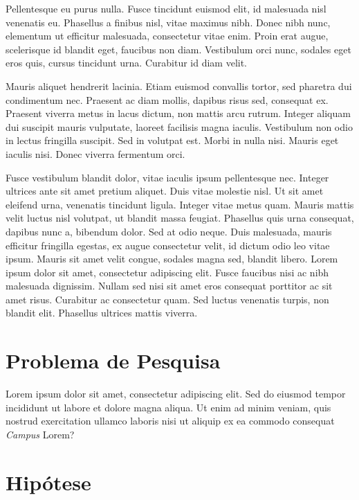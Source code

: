 Pellentesque eu purus nulla. Fusce tincidunt euismod elit, id malesuada nisl venenatis eu. Phasellus a finibus nisl, vitae maximus nibh. Donec nibh nunc, elementum ut efficitur malesuada, consectetur vitae enim. Proin erat augue, scelerisque id blandit eget, faucibus non diam. Vestibulum orci nunc, sodales eget eros quis, cursus tincidunt urna. Curabitur id diam velit.

Mauris aliquet hendrerit lacinia. Etiam euismod convallis tortor, sed pharetra dui condimentum nec. Praesent ac diam mollis, dapibus risus sed, consequat ex. Praesent viverra metus in lacus dictum, non mattis arcu rutrum. Integer aliquam dui suscipit mauris vulputate, laoreet facilisis magna iaculis. Vestibulum non odio in lectus fringilla suscipit. Sed in volutpat est. Morbi in nulla nisi. Mauris eget iaculis nisi. Donec viverra fermentum orci.

Fusce vestibulum blandit dolor, vitae iaculis ipsum pellentesque nec. Integer ultrices ante sit amet pretium aliquet. Duis vitae molestie nisl. Ut sit amet eleifend urna, venenatis tincidunt ligula. Integer vitae metus quam. Mauris mattis velit luctus nisl volutpat, ut blandit massa feugiat. Phasellus quis urna consequat, dapibus nunc a, bibendum dolor. Sed at odio neque. Duis malesuada, mauris efficitur fringilla egestas, ex augue consectetur velit, id dictum odio leo vitae ipsum. Mauris sit amet velit congue, sodales magna sed, blandit libero. Lorem ipsum dolor sit amet, consectetur adipiscing elit. Fusce faucibus nisi ac nibh malesuada dignissim. Nullam sed nisi sit amet eros consequat porttitor ac sit amet risus. Curabitur ac consectetur quam. Sed luctus venenatis turpis, non blandit elit. Phasellus ultrices mattis viverra.

\section{Problema de Pesquisa}
\label{sec:problema}

Lorem ipsum dolor sit amet, consectetur adipiscing elit. Sed do eiusmod 
tempor incididunt ut labore et dolore magna aliqua. Ut enim ad minim 
veniam, quis nostrud exercitation ullamco laboris nisi ut aliquip ex ea 
commodo consequat \textit{Campus} Lorem?

\section{Hipótese}
\label{sec:hipotese}

